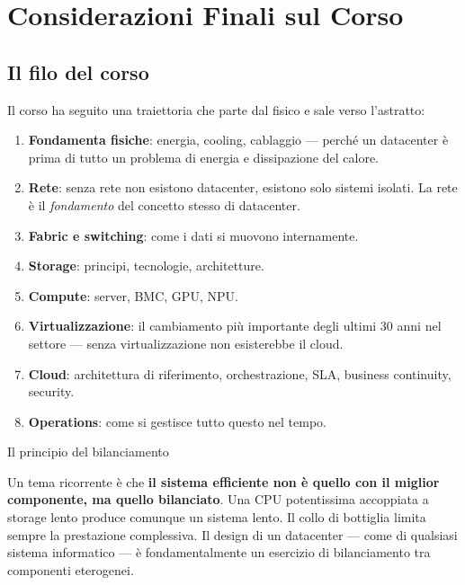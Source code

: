 \documentclass[
  italian,
  openany]{book}
\providecommand{\tightlist}{%
  \setlength{\itemsep}{0pt}\setlength{\parskip}{0pt}}
\begin{document}
\section{Considerazioni Finali sul
Corso}\label{considerazioni-finali-sul-corso}

\subsection{Il filo del corso}\label{il-filo-del-corso}

Il corso ha seguito una traiettoria che parte dal fisico e sale verso
l'astratto:

\begin{enumerate}
\def\labelenumi{\arabic{enumi}.}
\tightlist
\item
  \textbf{Fondamenta fisiche}: energia, cooling, cablaggio --- perché un
  datacenter è prima di tutto un problema di energia e dissipazione del
  calore.
\item
  \textbf{Rete}: senza rete non esistono datacenter, esistono solo
  sistemi isolati. La rete è il \emph{fondamento} del concetto stesso di
  datacenter.
\item
  \textbf{Fabric e switching}: come i dati si muovono internamente.
\item
  \textbf{Storage}: principi, tecnologie, architetture.
\item
  \textbf{Compute}: server, BMC, GPU, NPU.
\item
  \textbf{Virtualizzazione}: il cambiamento più importante degli ultimi
  30 anni nel settore --- senza virtualizzazione non esisterebbe il
  cloud.
\item
  \textbf{Cloud}: architettura di riferimento, orchestrazione, SLA,
  business continuity, security.
\item
  \textbf{Operations}: come si gestisce tutto questo nel tempo.
\end{enumerate}

\begin{callouttip}{Il principio del bilanciamento}

Un tema ricorrente è che \textbf{il sistema efficiente non è quello con
il miglior componente, ma quello bilanciato}. Una CPU potentissima
accoppiata a storage lento produce comunque un sistema lento. Il collo
di bottiglia limita sempre la prestazione complessiva. Il design di un
datacenter --- come di qualsiasi sistema informatico --- è
fondamentalmente un esercizio di bilanciamento tra componenti
eterogenei.

\end{callouttip}
\end{document}
